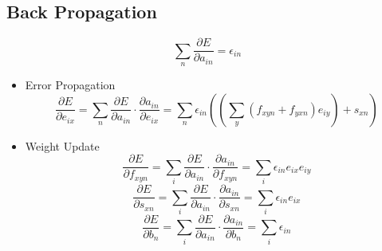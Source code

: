 \documentclass[12pt]{article}
\begin{document}
    \subsection{Back Propagation}
    \begin{equation}
    \sum_n \frac{\partial E}{\partial a_{in}} = \epsilon_{in}
    \end{equation}
    \begin{itemize}
        \item Error Propagation
        \begin{equation}
        \frac{\partial E}{\partial e_{ix}} = \sum_n \frac{\partial E}{\partial a_{in}} \cdot \frac{\partial a_{in}}{\partial e_{ix}} = \sum_n  \epsilon_{in} ((\sum_y (f_{xyn} + f_{yxn}) e_{iy}) + s_{xn})
        \end{equation}

        \item Weight Update
        \begin{equation}
        \frac{\partial E}{\partial f_{xyn}} = \sum_i \frac{\partial E}{\partial a_{in}} \cdot \frac{\partial a_{in}}{\partial f_{xyn}} = \sum_i  \epsilon_{in} e_{ix} e_{iy}
        \end{equation}
        \begin{equation}
        \frac{\partial E}{\partial s_{xn}} = \sum_i \frac{\partial E}{\partial a_{in}} \cdot \frac{\partial a_{in}}{\partial s_{xn}} = \sum_i  \epsilon_{in} e_{ix}
        \end{equation}
        \begin{equation}
        \frac{\partial E}{\partial b_n} = \sum_i \frac{\partial E}{\partial a_{in}} \cdot \frac{\partial a_{in}}{\partial b_n} = \sum_i  \epsilon_{in}
        \end{equation}
    \end{itemize}
\end{document}
